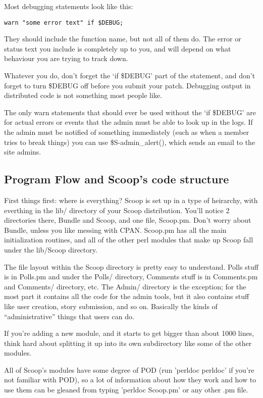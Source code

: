 Most debugging statements look like this:
\begin{verbatim}
warn "some error text" if $DEBUG;
\end{verbatim}
They should include the function name, but not all of them do.  The error or status text you include is completely up to you, and will depend on what behaviour you are trying to track down.

Whatever you do, don't forget the `if \$DEBUG' part of the statement, and don't forget to turn \$DEBUG off before you submit your patch. Debugging output in distributed code is not something most people like.

The only warn statements that should ever be used without the `if \$DEBUG' are for actual errors or events that the admin must be able to look up in the logs. If the admin must be notified of something immediately (such as when a member tries to break things) you can use \$S-\latexhtml{$>$}{>}admin\_alert(), which sends an email to the site admins.

\subsection{Program Flow and Scoop's code structure}
\label{hacking-flow}

First things first: where is everything? Scoop is set up in a type of heirarchy, with everthing in the lib/ directory of your Scoop distribution. You'll notice 2 directories there, Bundle and Scoop, and one file, Scoop.pm. Don't worry about Bundle, unless you like messing with CPAN. Scoop.pm has all the main initialization routines, and all of the other perl modules that make up Scoop fall under the lib/Scoop directory.

The file layout within the Scoop directory is pretty easy to understand. Polls stuff is in Polls.pm and under the Polls/ directory, Comments stuff is in Comments.pm and Comments/ directory, etc. The Admin/ directory is the exception; for the most part it contains all the code for the admin tools, but it also contains stuff like user creation, story submission, and so on. Basically the kinds of ``administrative'' things that users can do.

If you're adding a new module, and it starts to get bigger than about 1000 lines, think hard about splitting it up into its own subdirectory like some of the other modules.

All of Scoop's modules have some degree of POD (run 'perldoc perldoc' if you're not familiar with POD), so a lot of information about how they work and how to use them can be gleaned from typing 'perldoc Scoop.pm' or any other .pm file.

